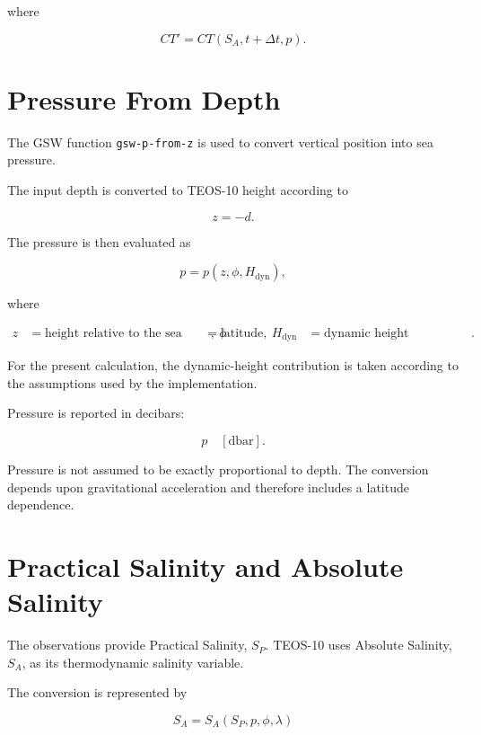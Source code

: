 \documentclass[11pt]{article}
\begin{document}
where

\begin{equation}
CT'=CT(S_A,t+\Delta t,p).
\end{equation}

\section{Pressure From Depth}

The GSW function \texttt{gsw-p-from-z} is used to convert vertical
position into sea pressure.

The input depth is converted to TEOS-10 height according to

\begin{equation}
z=-d.
\end{equation}

The pressure is then evaluated as

\begin{equation}
p=
p(z,\phi,H_{\mathrm{dyn}}),
\end{equation}

where

\begin{align}
z &= \text{height relative to the sea surface},\
\phi &= \text{latitude},\
H_{\mathrm{dyn}} &= \text{dynamic height contribution}.
\end{align}

For the present calculation, the dynamic-height contribution is taken
according to the assumptions used by the implementation.

Pressure is reported in decibars:

\begin{equation}
p\quad [\mathrm{dbar}].
\end{equation}

Pressure is not assumed to be exactly proportional to depth. The
conversion depends upon gravitational acceleration and therefore
includes a latitude dependence.

\section{Practical Salinity and Absolute Salinity}

The observations provide Practical Salinity, $S_P$. TEOS-10 uses
Absolute Salinity, $S_A$, as its thermodynamic salinity variable.

The conversion is represented by

\begin{equation}
\boxed{
S_A =
S_A(S_P,p,\phi,\lambda)
}
\end{equation}
\end{document}

